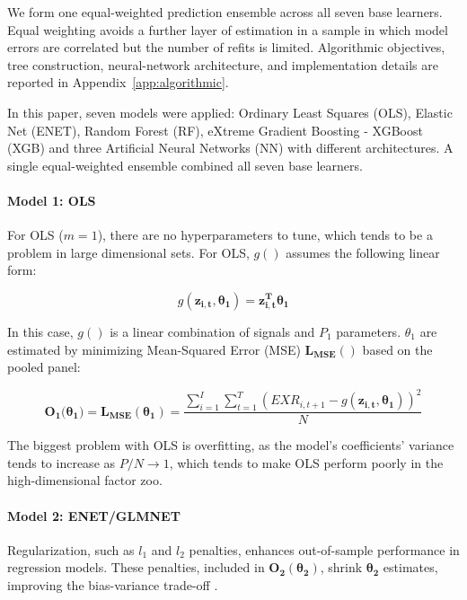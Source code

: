 \documentclass[preprint,12pt,authoryear]{elsarticle}
\begin{document}
We form one equal-weighted prediction ensemble across all seven base learners. Equal weighting avoids a further layer of estimation in a sample in which model errors are correlated but the number of refits is limited. Algorithmic objectives, tree construction, neural-network architecture, and implementation details are reported in Appendix~\ref{app:algorithmic}.

\iffalse
In this paper, seven models were applied: Ordinary Least Squares (OLS), Elastic Net (ENET), Random Forest (RF), eXtreme Gradient Boosting - XGBoost (XGB) and three Artificial Neural Networks (NN) with different architectures. A single equal-weighted ensemble combined all seven base learners.

\paragraph{Model 1: OLS}
For OLS ($m = 1$), there are no hyperparameters to tune, which tends to be a problem in large dimensional sets. For OLS, $g()$ assumes the following linear form:

\begin{equation}
g(\mathbf{z_{i,t}},\mathbf{\theta_{1}}) = \mathbf{z^{T}_{i,t}} \mathbf{\theta_{1}}
\end{equation}

In this case, $g()$ is a linear combination of signals and $P_{1}$ parameters. $\theta_{1}$ are estimated by minimizing Mean-Squared Error (MSE) $\mathbf{L_{MSE}()}$ based on the pooled panel:

\begin{equation}
\mathbf{O_{1}(\mathbf{\theta_{1})}} = \mathbf{L_{MSE}(\mathbf{\theta_{1}})} = \frac{\sum_{i=1}^{I}\sum_{t=1}^{T}(EXR_{i,t+1} - g(\mathbf{z_{i,t}},\mathbf{\theta_{1}}))^2}{N}
\end{equation}

The biggest problem with OLS is overfitting, as the model's coefficients' variance tends to increase as $P/N \rightarrow 1$, which tends to make OLS perform poorly in the high-dimensional factor zoo.


\paragraph{Model 2: ENET/GLMNET}

Regularization, such as $l_{1}$ and $l_{2}$ penalties, enhances out-of-sample performance in regression models. These penalties, included in $\mathbf{O_{2}(\mathbf{\theta_{2}})}$, shrink $\mathbf{\theta_{2}}$ estimates, improving the bias-variance trade-off \citep{jamesetal2013}. 
\end{document}
